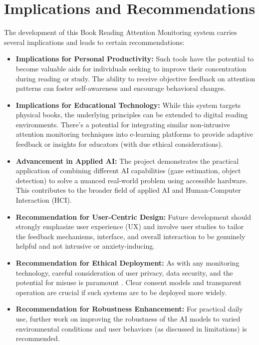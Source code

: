 \section{Implications and Recommendations }
The development of this Book Reading Attention Monitoring system carries several implications and leads to certain recommendations:
\begin{itemize}
    \item \textbf{Implications for Personal Productivity:} Such tools have the potential to become valuable aids for individuals seeking to improve their concentration during reading or study. The ability to receive objective feedback on attention patterns can foster self-awareness and encourage behavioral changes.
    \item \textbf{Implications for Educational Technology:} While this system targets physical books, the underlying principles can be extended to digital reading environments. There's a potential for integrating similar non-intrusive attention monitoring techniques into e-learning platforms to provide adaptive feedback or insights for educators (with due ethical considerations).
    \item \textbf{Advancement in Applied AI:} The project demonstrates the practical application of combining different AI capabilities (gaze estimation, object detection) to solve a nuanced real-world problem using accessible hardware. This contributes to the broader field of applied AI and Human-Computer Interaction (HCI).
    \item \textbf{Recommendation for User-Centric Design:} Future development should strongly emphasize user experience (UX) and involve user studies to tailor the feedback mechanisms, interface, and overall interaction to be genuinely helpful and not intrusive or anxiety-inducing.
    \item \textbf{Recommendation for Ethical Deployment:} As with any monitoring technology, careful consideration of user privacy, data security, and the potential for misuse is paramount \cite{Gupta_EthicalAIEd_2024}. Clear consent models and transparent operation are crucial if such systems are to be deployed more widely.
    \item \textbf{Recommendation for Robustness Enhancement:} For practical daily use, further work on improving the robustness of the AI models to varied environmental conditions and user behaviors (as discussed in limitations) is recommended.
\end{itemize}

